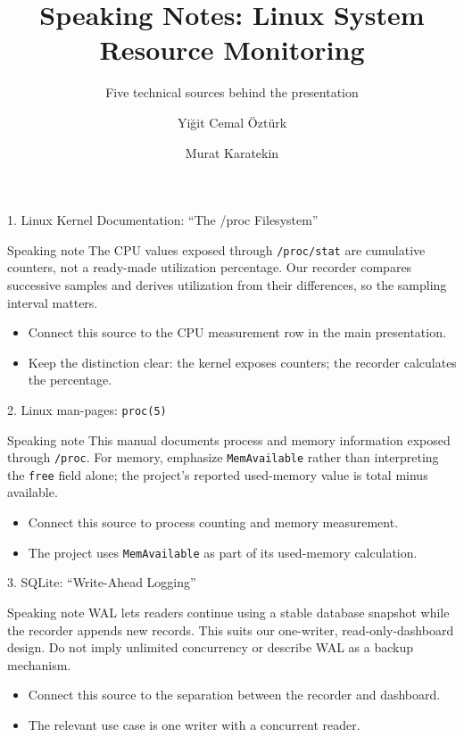 \documentclass[aspectratio=169,10pt]{beamer}
\title[Linux Resource Monitor]{Speaking Notes: Linux System Resource Monitoring}
\subtitle{Five technical sources behind the presentation}
\author{Yiğit Cemal Öztürk \and Murat Karatekin}
\institute{Kocaeli University \\ TBL221 Linux Operating System Usage and Administration}
\date{}
\begin{document}
\begin{frame}[plain]
  \titlepage
\end{frame}

\begin{frame}{1. Linux Kernel Documentation: ``The /proc Filesystem''}
\begin{block}{Speaking note}
The CPU values exposed through \texttt{/proc/stat} are cumulative counters, not a ready-made utilization percentage. Our recorder compares successive samples and derives utilization from their differences, so the sampling interval matters.
\end{block}
\begin{itemize}
  \item Connect this source to the CPU measurement row in the main presentation.
  \item Keep the distinction clear: the kernel exposes counters; the recorder calculates the percentage.
\end{itemize}
\end{frame}

\begin{frame}{2. Linux man-pages: \texttt{proc(5)}}
\begin{block}{Speaking note}
This manual documents process and memory information exposed through \texttt{/proc}. For memory, emphasize \texttt{MemAvailable} rather than interpreting the \texttt{free} field alone; the project's reported used-memory value is total minus available.
\end{block}
\begin{itemize}
  \item Connect this source to process counting and memory measurement.
  \item The project uses \texttt{MemAvailable} as part of its used-memory calculation.
\end{itemize}
\end{frame}

\begin{frame}{3. SQLite: ``Write-Ahead Logging''}
\begin{block}{Speaking note}
WAL lets readers continue using a stable database snapshot while the recorder appends new records. This suits our one-writer, read-only-dashboard design. Do not imply unlimited concurrency or describe WAL as a backup mechanism.
\end{block}
\begin{itemize}
  \item Connect this source to the separation between the recorder and dashboard.
  \item The relevant use case is one writer with a concurrent reader.
\end{itemize}
\end{frame}
\end{document}
